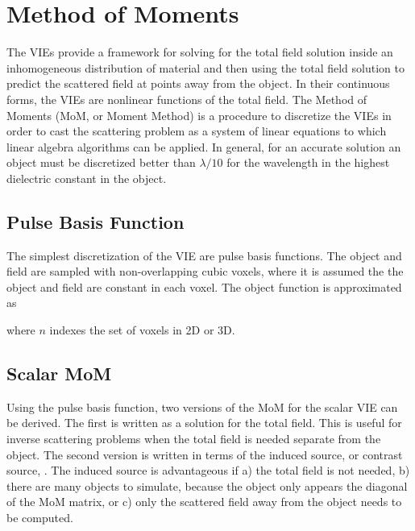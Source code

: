 {\footnotesize
{}
}

\clearpage
\newpage


\section{Method of Moments}

The VIEs provide a framework for solving for the total field solution inside an inhomogeneous distribution of material and then using the total field solution to predict the scattered field at points away from the object. In their continuous forms, the VIEs are nonlinear functions of the total field. The Method of Moments (MoM, or Moment Method) is a procedure to discretize the VIEs in order to cast the scattering problem as a system of linear equations to which linear algebra algorithms can be applied. In general, for an accurate solution an object must be discretized better than $\lambda/10$ for the wavelength in the highest dielectric constant in the object. 

\subsection{Pulse Basis Function}
The simplest discretization of the VIE are pulse basis functions. The object and field are sampled with non-overlapping cubic voxels, where it is assumed the the object and field are constant in each voxel. The object function is approximated as 

\noindent where $n$ indexes the set of voxels in 2D or 3D.  

\subsection{Scalar MoM} 

Using the pulse basis function, two versions of the MoM for the scalar VIE can be derived. The first is written as a solution for the total field. This is useful for inverse scattering problems when the total field is needed separate from the object.  The second version is written in terms of the induced source, or contrast source, \cite{van1997contrast}. The induced source is advantageous if a) the total field is not needed, b) there are many objects to simulate, because  the object only appears the diagonal of the MoM matrix, or c) only the scattered field away from the object needs to be computed.

